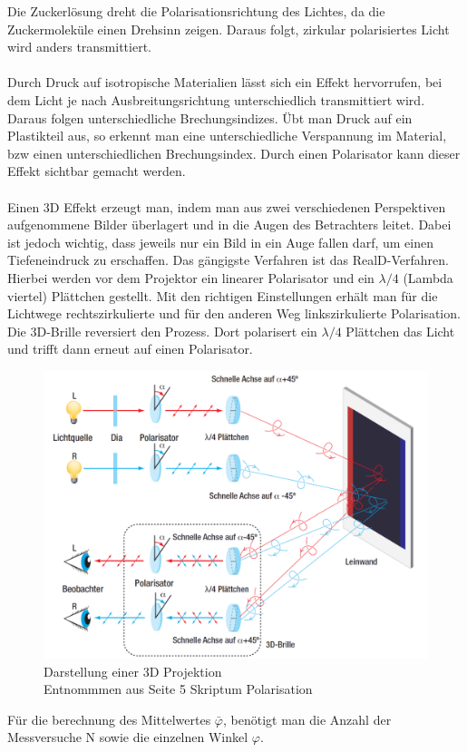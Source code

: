 \documentclass[12pt,a4paper,twoside]{article}
\begin{document}
\noindent
Die Zuckerlösung dreht die Polarisationsrichtung des Lichtes, da die Zuckermoleküle einen Drehsinn zeigen. 
Daraus folgt, zirkular polarisiertes Licht wird anders transmittiert. 
\\
\\
Durch Druck auf isotropische Materialien lässt sich ein Effekt hervorrufen, bei dem Licht je nach Ausbreitungsrichtung unterschiedlich transmittiert wird. Daraus folgen unterschiedliche Brechungsindizes. 
Übt man Druck auf ein Plastikteil aus, so erkennt man eine unterschiedliche Verspannung im Material, bzw einen unterschiedlichen Brechungsindex. 
Durch einen Polarisator kann dieser Effekt sichtbar gemacht werden. 
\\
\\
Einen 3D Effekt erzeugt man, indem man aus zwei verschiedenen Perspektiven aufgenommene Bilder überlagert und in die Augen des Betrachters leitet. 
Dabei ist jedoch wichtig, dass jeweils nur ein Bild in ein Auge fallen darf, um einen Tiefeneindruck zu erschaffen. 
Das gängigste Verfahren ist das RealD-Verfahren. Hierbei werden vor dem Projektor ein linearer Polarisator und ein $\lambda/4$ (Lambda viertel) Plättchen gestellt. 
Mit den richtigen Einstellungen erhält man für die Lichtwege rechtszirkulierte und für den anderen Weg linkszirkulierte Polarisation. \\
Die 3D-Brille reversiert den Prozess. Dort polarisert ein $\lambda/4$ Plättchen das Licht und trifft dann erneut auf einen Polarisator. 

\begin{figure}[H]
    \centering
    \includegraphics[width=0.6\linewidth]{nudes/3D.png}
    \caption{Darstellung einer 3D Projektion \\ Entnommmen aus Seite 5 Skriptum Polarisation \cite{teachcenter2}}
    \label{fig:3D Projektion schema}
\end{figure}

\noindent
Für die berechnung des Mittelwertes $\bar{\varphi}$, benötigt man die Anzahl der Messversuche N sowie die einzelnen Winkel $\varphi$. 
\end{document}
